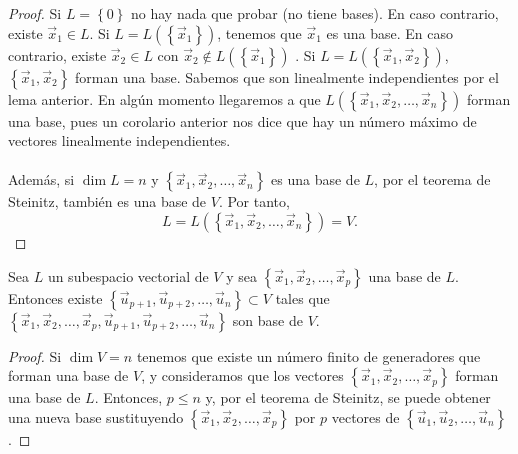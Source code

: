 \begin{proof}
Si $\displaystyle L = \left\{ 0\right\}  $ no hay nada que probar (no tiene bases). En caso contrario, existe $\displaystyle \vec{x}_{1} \in L $. Si $\displaystyle L = L\left( \left\{ \vec{x}_{1}\right\} \right) $, tenemos que $\displaystyle \vec{x}_{1} $ es una base. En caso contrario, existe $\displaystyle \vec{x}_{2} \in L $ con $\displaystyle \vec{x}_{2} \not\in L \left( \left\{ \vec{x}_{1}\right\} \right) $ . Si $\displaystyle L = L\left( \left\{ \vec{x}_{1}, \vec{x}_{2}\right\} \right) $, $\displaystyle \left\{ \vec{x}_{1}, \vec{x}_{2}\right\}  $ forman una base. Sabemos que son linealmente independientes por el lema anterior. En algún momento llegaremos a que $\displaystyle L\left( \left\{ \vec{x}_{1}, \vec{x}_{2}, \ldots, \vec{x}_{n}\right\} \right) $ forman una base, pues un corolario anterior nos dice que hay un número máximo de vectores linealmente independientes. \\ \\
Además, si $\displaystyle \dim L = n $ y $\displaystyle \left\{ \vec{x}_{1}, \vec{x}_{2}, \ldots, \vec{x}_{n}\right\}  $ es una base de $\displaystyle L $, por el teorema de Steinitz, también es una base de $\displaystyle V $. Por tanto, 
\[ L = L\left( \left\{ \vec{x}_{1}, \vec{x}_{2}, \ldots, \vec{x}_{n}\right\} \right) = V .\]
\end{proof}

\begin{ftheorem}
\normalfont Sea $\displaystyle L $ un subespacio vectorial de $\displaystyle V $ y sea $\displaystyle \left\{ \vec{x}_{1}, \vec{x}_{2}, \ldots, \vec{x}_{p}\right\}  $ una base de $\displaystyle L $. Entonces existe $\displaystyle \left\{ \vec{u}_{p+1}, \vec{u}_{p+2}, \ldots, \vec{u}_{n}\right\} \subset V $ tales que $\displaystyle \left\{ \vec{x}_{1}, \vec{x}_{2}, \ldots, \vec{x}_{p}, \vec{u}_{p+1}, \vec{u}_{p+2}, \ldots, \vec{u}_{n}\right\}  $ son base de $\displaystyle V $.
\end{ftheorem}

\begin{proof}
Si $\displaystyle \dim V = n $ tenemos que existe un número finito de generadores que forman una base de $\displaystyle V $, y consideramos que los vectores $\displaystyle \left\{ \vec{x}_{1}, \vec{x}_{2}, \ldots, \vec{x}_{p}\right\}  $ forman una base de $\displaystyle L $. Entonces, $\displaystyle p \leq n $ y, por el teorema de Steinitz, se puede obtener una nueva base sustituyendo $\displaystyle \left\{ \vec{x}_{1}, \vec{x}_{2}, \ldots, \vec{x}_{p}\right\}  $ por $\displaystyle p $ vectores de $\displaystyle \left\{ \vec{u}_{1}, \vec{u}_{2}, \ldots, \vec{u}_{n}\right\}  $.
\end{proof}

